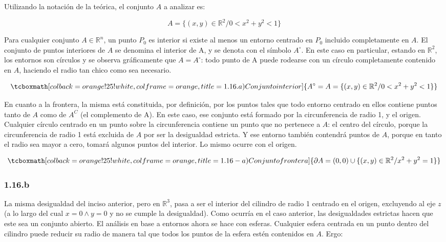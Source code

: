 \documentclass{article}
\renewcommand{\Bbb}{\mathbb}
\begin{document}
Utilizando la notación de la teórica, el conjunto $A$ a analizar es:

\begin{equation}
A = \{ (x,y) \in \Bbb R^2 / 0 < x^2 + y^2 < 1 \}
\end{equation}

Para cualquier conjunto $A \in \Bbb R^n$, un punto $P_0$ es interior si existe al menos un entorno centrado en $P_0$ incluido completamente en $A$. El conjunto de puntos interiores de $A$ se denomina el interior de A, y se denota con el símbolo $A^{\circ}$. En este caso en particular, estando en $\Bbb R^2$, los entornos son círculos y se observa gráficamente que $A = A^{\circ}$: todo punto de A puede rodearse con un círculo completamente contenido en $A$, haciendo el radio tan chico como sea necesario.

\begin{equation}
\tcboxmath[colback=orange!25!white,colframe=orange, title=1.16.a) Conjunto interior]
{ A^{\circ} = A = \{ (x,y) \in \Bbb R^2 / 0 < x^2 + y^2 < 1 \}  }
\end{equation}

En cuanto a la frontera, la misma está constituida, por definición, por los puntos tales que todo entorno centrado en ellos contiene puntos tanto de $A$ como de $A^C$ (el complemento de A). En este caso, ese conjunto está formado por la circunferencia de radio 1, y el origen. Cualquier círculo centrado en un punto sobre la circunferencia contiene un punto que no pertenece a $A$: el centro del círculo, porque la circunferencia de radio 1 está excluida de $A$ por ser la desigualdad estricta. Y ese entorno también contendrá puntos de $A$, porque en tanto el radio sea mayor a cero, tomará algunos puntos del interior. Lo mismo ocurre con el origen.

\begin{equation}
\tcboxmath[colback=orange!25!white,colframe=orange, title=1.16-a) Conjunto frontera]
{ \partial{A} = (0,0) \cup \{ (x,y) \in \Bbb R^2 / x^2 + y^2 = 1 \}  }
\end{equation}

\subsubsection*{1.16.b}
\label{subsubsec:1.16.b}

La misma desigualdad del inciso anterior, pero en $\Bbb R^3$, pasa a ser el interior del cilindro de radio 1 centrado en el origen, excluyendo al eje $z$ (a lo largo del cual $x = 0 \wedge y = 0$ y no se cumple la desigualdad). Como ocurría en el caso anterior, las desigualdades estrictas hacen que este sea un conjunto abierto. El análisis en base a entornos ahora se hace con esferas. Cualquier esfera centrada en un punto dentro del cilindro puede reducir su radio de manera tal que todos los puntos de la esfera estén contenidos en $A$. Ergo:
\end{document}
